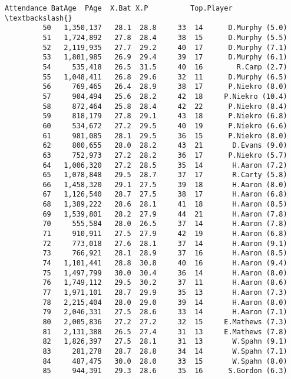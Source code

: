 \documentclass[11pt]{article}
\begin{document}
\begin{Verbatim}[commandchars=\\\{\}]
             Attendance BatAge  PAge  X.Bat X.P          Top.Player  \textbackslash{}
         50   1,350,137   28.1  28.8     33  14      D.Murphy (5.0)   
         51   1,724,892   27.8  28.4     38  15      D.Murphy (5.5)   
         52   2,119,935   27.7  29.2     40  17      D.Murphy (7.1)   
         53   1,801,985   26.9  29.4     39  17      D.Murphy (6.1)   
         54     535,418   26.5  31.5     40  16        R.Camp (2.7)   
         55   1,048,411   26.8  29.6     32  11      D.Murphy (6.5)   
         56     769,465   26.4  28.9     38  17      P.Niekro (8.0)   
         57     904,494   25.6  28.2     42  18     P.Niekro (10.4)   
         58     872,464   25.8  28.4     42  22      P.Niekro (8.4)   
         59     818,179   27.8  29.1     43  18      P.Niekro (6.8)   
         60     534,672   27.2  29.5     40  19      P.Niekro (6.6)   
         61     981,085   28.1  29.5     36  15      P.Niekro (8.0)   
         62     800,655   28.0  28.2     43  21       D.Evans (9.0)   
         63     752,973   27.2  28.2     36  17      P.Niekro (5.7)   
         64   1,006,320   27.2  28.5     35  14       H.Aaron (7.2)   
         65   1,078,848   29.5  28.7     37  17       R.Carty (5.8)   
         66   1,458,320   29.1  27.5     39  18       H.Aaron (8.0)   
         67   1,126,540   28.7  27.5     38  17       H.Aaron (6.8)   
         68   1,389,222   28.6  28.1     41  18       H.Aaron (8.5)   
         69   1,539,801   28.2  27.9     44  21       H.Aaron (7.8)   
         70     555,584   28.0  26.5     37  14       H.Aaron (7.8)   
         71     910,911   27.5  27.9     42  19       H.Aaron (6.8)   
         72     773,018   27.6  28.1     37  14       H.Aaron (9.1)   
         73     766,921   28.1  28.9     37  16       H.Aaron (8.5)   
         74   1,101,441   28.8  30.8     40  16       H.Aaron (9.4)   
         75   1,497,799   30.0  30.4     36  14       H.Aaron (8.0)   
         76   1,749,112   29.5  30.2     37  11       H.Aaron (8.6)   
         77   1,971,101   28.7  29.9     35  13       H.Aaron (7.3)   
         78   2,215,404   28.0  29.0     39  14       H.Aaron (8.0)   
         79   2,046,331   27.5  28.6     33  14       H.Aaron (7.1)   
         80   2,005,836   27.2  27.2     32  15     E.Mathews (7.3)   
         81   2,131,388   26.5  27.4     31  13     E.Mathews (7.8)   
         82   1,826,397   27.5  28.1     31  13       W.Spahn (9.1)   
         83     281,278   28.7  28.8     34  14       W.Spahn (7.1)   
         84     487,475   30.0  28.0     33  15       W.Spahn (8.0)   
         85     944,391   29.3  28.6     35  16      S.Gordon (6.3)   

\end{Verbatim}
\end{document}
